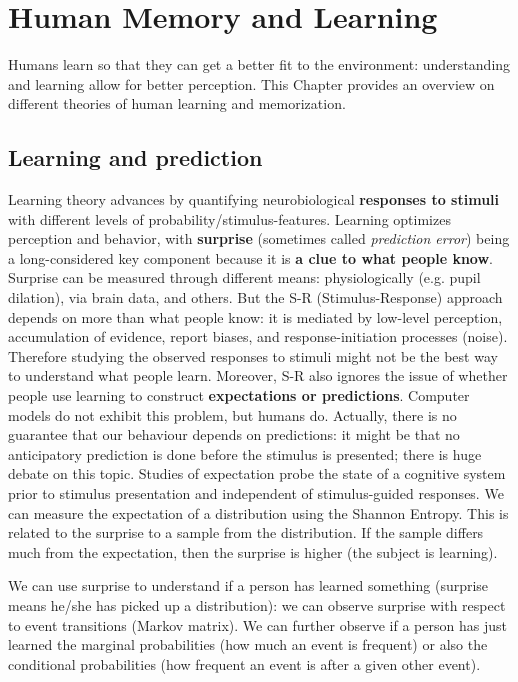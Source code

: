 \chapter{Human Memory and Learning}
\label{chap:modeling_memory}

Humans learn so that they can get a better fit to the environment: understanding and learning allow for better perception. This Chapter provides an overview on different theories of human learning and memorization. 

\section{Learning and prediction}
Learning theory  advances by quantifying neurobiological \textbf{responses to stimuli} with different levels of probability/stimulus-features. Learning optimizes perception and behavior, with \textbf{surprise} (sometimes called \textit{prediction error}) being a long-considered key component because it is \textbf{a clue to what people know}. Surprise can be measured through different means: physiologically (e.g. pupil dilation), via brain data, and others.
But the S-R (Stimulus-Response) approach depends on more than what people know: it is mediated by low-level perception, accumulation of evidence, report biases, and response-initiation processes (noise). Therefore studying the observed responses to stimuli might not be the best way to understand what people learn.
Moreover, S-R also ignores the issue of whether people use learning to construct \textbf{expectations or predictions}. Computer models do not exhibit this problem, but humans do. Actually, there is no guarantee that our behaviour depends on predictions: it might be that no anticipatory prediction is done before the stimulus is presented; there is huge debate on this topic.
Studies of expectation probe the state of a cognitive system prior to stimulus presentation and independent of stimulus-guided responses. We can measure the expectation of a distribution using the Shannon Entropy. This is related to the surprise to a sample from the distribution. If the sample differs much from the expectation, then the surprise is higher (the subject is learning).

We can use surprise to understand if a person has learned something (surprise means he/she has picked up a distribution): we can observe surprise with respect to event transitions (Markov matrix). We can further observe if a person has just learned the marginal probabilities (how much an event is frequent) or also the conditional probabilities (how frequent an event is after a given other event).

